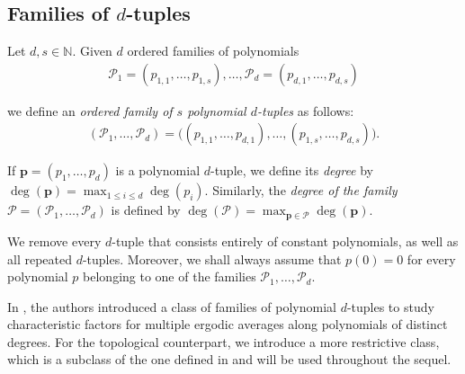 \documentclass[11pt,reqno]{amsart}
\newcommand{\N}{\mathbb{N}}
\newcommand{\cP}{{\mathcal P}}
\theoremstyle{definition}
\theoremstyle{remark}
\begin{document}
\subsection{Families of $d$-tuples}

Let $d,s\in\N$. Given $d$ ordered families of polynomials\begin{align*}
    \cP_1=(p_{1,1},\ldots,p_{1,s}) ,\ldots, \cP_d=(p_{d,1},\ldots,p_{d,s})
\end{align*}

we define an \emph{ordered family of $s$ polynomial $d$-tuples} as follows:\begin{align*}
(\cP_1,\ldots,\cP_d)=\big((p_{1,1},\ldots,p_{d,1}),\ldots,(p_{1,s},\ldots,p_{d,s})\big).
\end{align*}

If $\mathbf{p}=(p_1,\ldots,p_d)$ is a polynomial $d$-tuple, we define its \emph{degree} by $\deg(\mathbf{p}) = \max_{1\leq i\leq d}\deg(p_i)$.  Similarly, the \emph{degree of the family} $\cP=(\cP_1,\ldots,\cP_d)$ is defined by $\deg(\cP)=\max_{\mathbf{p}\in \cP} \deg(\mathbf{p})$.

We remove every $d$-tuple that consists entirely of constant polynomials, as well as all repeated $d$-tuples. Moreover, we shall always assume that $p(0)=0$ for every polynomial $p$ belonging to one of the families $\cP_1,\ldots,\cP_d$.

In \cite{Chu_Frantzikinakis_Host_ergodic_averages_distinct_degree:2011}, the authors introduced a class of families of polynomial $d$-tuples to study characteristic factors for multiple ergodic averages along polynomials of distinct degrees. For the topological counterpart, we introduce a more restrictive class, which is a subclass of the one defined in \cite{Chu_Frantzikinakis_Host_ergodic_averages_distinct_degree:2011} and will be used throughout the sequel.
\end{document}
